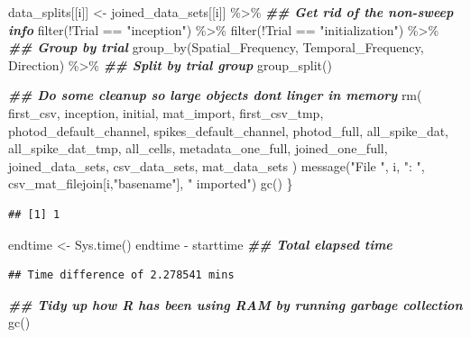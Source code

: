 \documentclass[
]{book}
\newenvironment{Shaded}{\begin{snugshade}}{\end{snugshade}}
\newcommand{\DocumentationTok}[1]{\textcolor[rgb]{0.56,0.35,0.01}{\textbf{\textit{#1}}}}
\newcommand{\FunctionTok}[1]{\textcolor[rgb]{0.00,0.00,0.00}{#1}}
\newcommand{\NormalTok}[1]{#1}
\newcommand{\OtherTok}[1]{\textcolor[rgb]{0.56,0.35,0.01}{#1}}
\newcommand{\SpecialCharTok}[1]{\textcolor[rgb]{0.00,0.00,0.00}{#1}}
\newcommand{\StringTok}[1]{\textcolor[rgb]{0.31,0.60,0.02}{#1}}
\begin{document}
\begin{Shaded}
\begin{Highlighting}[]
\NormalTok{  data\_splits[[i]] }\OtherTok{\textless{}{-}}
\NormalTok{    joined\_data\_sets[[i]] }\SpecialCharTok{\%\textgreater{}\%}
    \DocumentationTok{\#\# Get rid of the non{-}sweep info}
    \FunctionTok{filter}\NormalTok{(}\SpecialCharTok{!}\NormalTok{Trial }\SpecialCharTok{==} \StringTok{"inception"}\NormalTok{) }\SpecialCharTok{\%\textgreater{}\%}
    \FunctionTok{filter}\NormalTok{(}\SpecialCharTok{!}\NormalTok{Trial }\SpecialCharTok{==} \StringTok{"initialization"}\NormalTok{) }\SpecialCharTok{\%\textgreater{}\%}
    \DocumentationTok{\#\# Group by trial}
    \FunctionTok{group\_by}\NormalTok{(Spatial\_Frequency, Temporal\_Frequency, Direction) }\SpecialCharTok{\%\textgreater{}\%}
    \DocumentationTok{\#\# Split by trial group}
    \FunctionTok{group\_split}\NormalTok{()}

  \DocumentationTok{\#\# Do some cleanup so large objects don\textquotesingle{}t linger in memory}
  \FunctionTok{rm}\NormalTok{(}
\NormalTok{    first\_csv, inception, initial, mat\_import, first\_csv\_tmp,}
\NormalTok{    photod\_default\_channel, spikes\_default\_channel, photod\_full,}
\NormalTok{    all\_spike\_dat, all\_spike\_dat\_tmp, all\_cells,}
\NormalTok{    metadata\_one\_full, joined\_one\_full, joined\_data\_sets,}
\NormalTok{    csv\_data\_sets, mat\_data\_sets}
\NormalTok{  )}
  \FunctionTok{message}\NormalTok{(}\StringTok{"File "}\NormalTok{, i, }\StringTok{": "}\NormalTok{, csv\_mat\_filejoin[i,}\StringTok{"basename"}\NormalTok{], }\StringTok{" imported"}\NormalTok{)}
  \FunctionTok{gc}\NormalTok{()}
\NormalTok{\}}
\end{Highlighting}
\end{Shaded}

\begin{verbatim}
## [1] 1
\end{verbatim}

\begin{Shaded}
\begin{Highlighting}[]
\NormalTok{endtime }\OtherTok{\textless{}{-}} \FunctionTok{Sys.time}\NormalTok{()}
\NormalTok{endtime }\SpecialCharTok{{-}}\NormalTok{ starttime }\DocumentationTok{\#\# Total elapsed time}
\end{Highlighting}
\end{Shaded}

\begin{verbatim}
## Time difference of 2.278541 mins
\end{verbatim}

\begin{Shaded}
\begin{Highlighting}[]
\DocumentationTok{\#\# Tidy up how R has been using RAM by running garbage collection}
\FunctionTok{gc}\NormalTok{()}
\end{Highlighting}
\end{Shaded}
\end{document}
